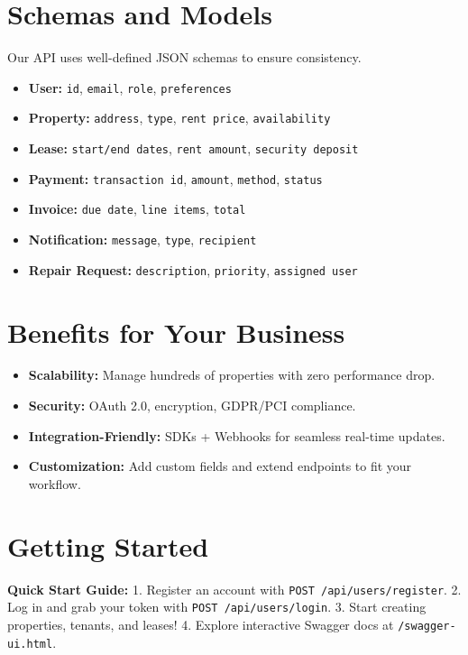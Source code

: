 \documentclass[11pt]{article}
\begin{document}
\section{Schemas and Models}
Our API uses well-defined JSON schemas to ensure consistency.

\begin{itemize}[leftmargin=*]
  \item \textbf{User:} \texttt{id}, \texttt{email}, \texttt{role}, \texttt{preferences}
  \item \textbf{Property:} \texttt{address}, \texttt{type}, \texttt{rent price}, \texttt{availability}
  \item \textbf{Lease:} \texttt{start/end dates}, \texttt{rent amount}, \texttt{security deposit}
  \item \textbf{Payment:} \texttt{transaction id}, \texttt{amount}, \texttt{method}, \texttt{status}
  \item \textbf{Invoice:} \texttt{due date}, \texttt{line items}, \texttt{total}
  \item \textbf{Notification:} \texttt{message}, \texttt{type}, \texttt{recipient}
  \item \textbf{Repair Request:} \texttt{description}, \texttt{priority}, \texttt{assigned user}
\end{itemize}

\section{Benefits for Your Business}
\begin{itemize}[leftmargin=*]
  \item \textbf{Scalability:} Manage hundreds of properties with zero performance drop.
  \item \textbf{Security:} OAuth 2.0, encryption, GDPR/PCI compliance.
  \item \textbf{Integration-Friendly:} SDKs + Webhooks for seamless real-time updates.
  \item \textbf{Customization:} Add custom fields and extend endpoints to fit your workflow.
\end{itemize}

\section{Getting Started}

\begin{quickstartbox}
\noindent
\textbf{Quick Start Guide:}  
1. Register an account with \texttt{POST /api/users/register}.  
2. Log in and grab your token with \texttt{POST /api/users/login}.  
3. Start creating properties, tenants, and leases!  
4. Explore interactive Swagger docs at \texttt{/swagger-ui.html}.  
\end{quickstartbox}
\end{document}
